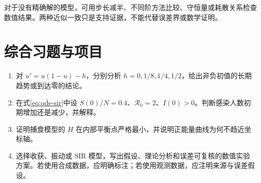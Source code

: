 对于没有精确解的模型，可用步长减半、不同阶方法比较、守恒量或耗散关系检查数值结果。两种近似一致只是支持证据，不能代替误差界或数学证明。

\section{综合习题与项目}
\begin{enumerate}
 \item\label{ex:ode-harvest} 对 $u'=u(1-u)-h$，分别分析 $h=0,1/8,1/4,1/2$，给出非负初值的长期趋势或到达零的结论。
 \item\label{ex:ode-sir} 在式\eqref{eq:ode-sir}中设 $S(0)/N=0.4$、$\mathcal R_0=2$、$I(0)>0$。判断感染人数初期增加还是减少，并解释。
 \item 证明捕食模型的 $H$ 在内部平衡点严格最小，并说明正能量曲线为何不趋近坐标轴。
 \item 选择收获、振动或 SIR 模型，写出假设、理论分析和误差可复核的数值实验方案。若使用合成数据，应明确标注；若使用观测数据，应注明来源与误差假设。
\end{enumerate}

